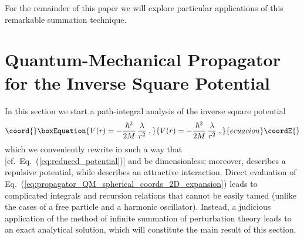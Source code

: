 \documentclass[a4paper,preprint,draft,showpacs,amsmath,amsfonts,amssymb,aps,prd]{revtex4}%
\begin{document}
For the remainder of this paper we will explore particular applications 
of this remarkable summation technique.



\section{Quantum-Mechanical Propagator for the Inverse Square Potential}
\label{sec:ISP}


In this section we start a path-integral analysis of the
inverse square potential 
\begin{equation}\coord{}\boxEquation{
V ( r ) = - \frac{\hbar^{2}}{2M}\, \frac{\lambda}{ r^{2} } 
\;  ,
\label{eq:ISP}
}{
V ( r ) = - \frac{\hbar^{2}}{2M}\, \frac{\lambda}{ r^{2} } 
\;  ,
}{ecuacion}\coordE{}\end{equation}
which we conveniently rewrite in such a way that 
\coordHE{} [cf.\ Eq.~(\ref{eq:reduced_potential})]
and
\myHighlight{$\lambda$}\coordHE{} be dimensionless; 
moreover, \coordHE{} describes a repulsive potential, while 
\coordHE{} describes an attractive interaction.
Direct evaluation of Eq.~(\ref{eq:propagator_QM_spherical_coords_2D_expansion}) 
leads to complicated integrals and recursion relations that cannot be easily tamed
(unlike the cases of a free particle and a harmonic oscillator). Instead,
a judicious application of the method of infinite summation of perturbation theory
leads to an exact analytical solution, which will constitute the main result of this section.
\end{document}
